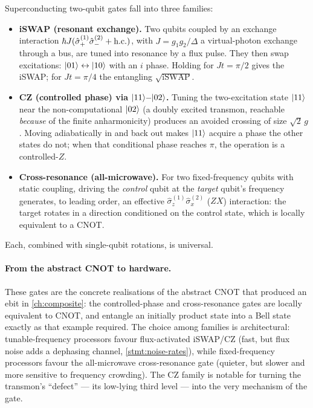 \begin{statement}
\label{stmt:two-qubit-gates}
Superconducting two-qubit gates fall into three families:
\begin{itemize}
\item \textbf{iSWAP (resonant exchange).} Two qubits coupled by an
  exchange interaction $\hbar J(\hat\sigma_+^{(1)}\hat\sigma_-^{(2)}+\text{h.c.})$,
  with $J=g_1g_2/\Delta$ a virtual-photon exchange through a bus, are
  tuned into resonance by a flux pulse. They then swap excitations:
  $\ket{01}\leftrightarrow\ket{10}$ with an $i$ phase. Holding for
  $Jt=\pi/2$ gives the iSWAP; for $Jt=\pi/4$ the entangling
  $\sqrt{\text{iSWAP}}$.
\item \textbf{CZ (controlled phase) via $\ket{11}$--$\ket{02}$.} Tuning
  the two-excitation state $\ket{11}$ near the non-computational
  $\ket{02}$ (a doubly excited transmon, reachable \emph{because} of
  the finite anharmonicity) produces an avoided crossing of size
  $\sqrt2\,g$. Moving adiabatically in and back out makes $\ket{11}$
  acquire a phase the other states do not; when that conditional phase
  reaches $\pi$, the operation is a controlled-$Z$.
\item \textbf{Cross-resonance (all-microwave).} For two fixed-frequency
  qubits with static coupling, driving the \emph{control} qubit at the
  \emph{target} qubit's frequency generates, to leading order, an
  effective $\hat\sigma_z^{(1)}\hat\sigma_x^{(2)}$ ($ZX$) interaction:
  the target rotates in a direction conditioned on the control state,
  which is locally equivalent to a CNOT.
\end{itemize}
Each, combined with single-qubit rotations, is universal.
\end{statement}

\paragraph{From the abstract CNOT to hardware.}
These gates are the concrete realisations of the abstract CNOT that
produced an ebit in \cref{ch:composite}: the controlled-phase and
cross-resonance gates are locally equivalent to CNOT, and entangle an
initially product state into a Bell state exactly as that example
required. The choice among families is architectural: tunable-frequency
processors favour flux-activated iSWAP/CZ (fast, but flux noise adds a
dephasing channel, \cref{stmt:noise-rates}), while fixed-frequency
processors favour the all-microwave cross-resonance gate (quieter, but
slower and more sensitive to frequency crowding). The CZ family is
notable for turning the transmon's ``defect'' --- its low-lying third
level --- into the very mechanism of the gate.

